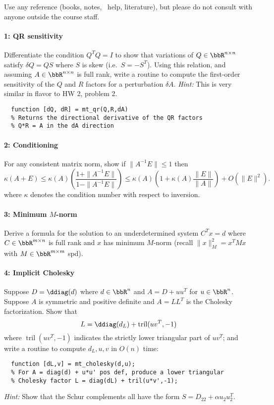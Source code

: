 \documentclass[12pt, leqno]{article} %
\newcommand{\tril}{\operatorname{tril}}
\begin{document}

Use any reference (books, notes, \matlab\ help, literature),
but please do not consult with anyone outside the course staff.

\paragraph*{1: QR sensitivity}
Differentiate the condition $Q^T Q = I$ to show that variations
of $Q \in \bbR^{n \times n}$ satisfy $\delta Q = Q S$ where $S$ is skew (i.e.~$S= -S^T$).
Using this relation, and assuming $A \in \bbR^{n \times n}$ is full rank,
write a routine to compute the first-order
sensitivity of the $Q$ and $R$ factors for a perturbation $\delta A$.
{\em Hint:} This is very similar in flavor to HW 2, problem 2.
\begin{lstlisting}
  function [dQ, dR] = mt_qr(Q,R,dA)
  % Returns the directional derivative of the QR factors
  % Q*R = A in the dA direction
\end{lstlisting}

\paragraph*{2: Conditioning}
For any consistent matrix norm, show if $\|A^{-1} E\| \leq 1$ then
\[
  \kappa(A+E) \leq
  \kappa(A) \left( \frac{1+\|A^{-1}E\|}{1-\|A^{-1}E\|} \right) \leq
  \kappa(A) \left( 1 + \kappa(A) \frac{\|E\|}{\|A\|} \right) + O(\|E\|^2).
\]
where $\kappa$ denotes the condition number with respect to inversion.

\paragraph*{3: Minimum $M$-norm}
Derive a formula for the solution to an underdetermined system
$C^T x = d$ where $C \in \bbR^{m \times n}$ is full rank and
$x$ has minimum $M$-norm
(recall $\|x\|_M^2 = x^T M x$ with $M \in \bbR^{m \times m}$ spd).

\paragraph*{4: Implicit Cholesky}
Suppose $D = \ddiag(d)$ where $d \in \bbR^n$
and $A = D + uu^T$ for $u \in \bbR^n$.  Suppose $A$ is symmetric
and positive definite and $A = L L^T$ is the Cholesky factorization.
Show that
\[
  L = \ddiag(d_L) + \tril(uv^T,-1)
\]
where $\tril(uv^T,-1)$ indicates the strictly lower triangular
part of $uv^T$; and write a routine to compute $d_L, u, v$ in $O(n)$
time:
\begin{lstlisting}
  function [dL,v] = mt_cholesky(d,u);
  % For A = diag(d) + u*u' pos def, produce a lower triangular
  % Cholesky factor L = diag(dL) + tril(u*v',-1);
\end{lstlisting}
{\em Hint:} Show that the Schur complements all have the form
$S = D_{22} + \alpha u_2 u_2^T$.
\end{document}
